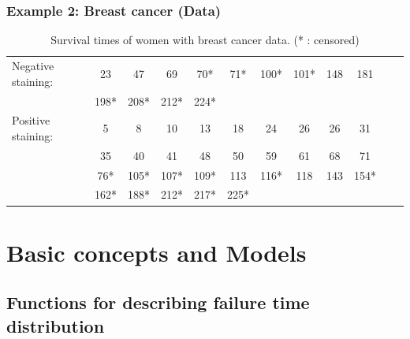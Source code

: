 \documentclass{beamer}
\newcommand{\currentsection}{}
\let\oldsection\section
\renewcommand{\section}[1]{\oldsection{#1}\renewcommand{\currentsection}{#1}}
\newcommand{\currentsubsection}{}
\let\oldsubsection\subsection
\renewcommand{\subsection}[1]{\oldsubsection{#1}\renewcommand{\currentsubsection}{#1}}
\begin{document}
\begin{frame} \frametitle{Example 2: Breast cancer (Data)}

\begin{scriptsize}
\begin{table}
\begin{center}
\caption{Survival times of women with breast cancer data. (* : censored)} \vspace{0.15cm}
  \begin{tabular}{l*{11}{c}}
    Negative staining: & 23 & 47 & 69 & 70* & 71* & 100* & 101* & 148 & 181\\
    & 198* & 208* &  212* & 224*\\

    Positive staining: &   5 &  8 &  10 &  13 & 18 &  24 &  26 &  26 & 31\\ 
    &  35 &  40 &  41 & 48 &  50 &  59 &  61 &  68 & 71\\ 
    & 76* & 105* & 107* & 109* & 113 & 116* & 118 & 143 & 154*\\ 
    &  162* &  188* &  212* &  217* &  225*\\
  \end{tabular}
\end{center}
\end{table}
\end{scriptsize}
\end{frame}



\section{Basic concepts and Models}
\subsection{Functions for describing failure time distribution}
\end{document}
